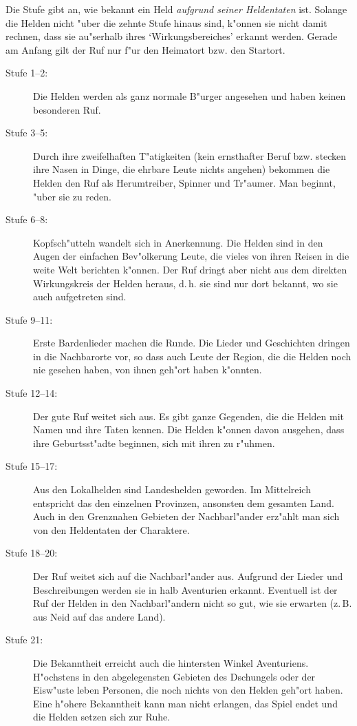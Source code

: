 Die Stufe gibt an, wie bekannt ein Held \emph{aufgrund seiner Heldentaten} ist. Solange die Helden nicht "uber die zehnte Stufe hinaus sind, k"onnen sie nicht damit rechnen, dass sie au"serhalb ihres `Wirkungsbereiches' erkannt werden. Gerade am Anfang gilt der Ruf nur f"ur den Heimatort bzw. den Startort.
\begin{description}
\item[Stufe 1--2:] Die Helden werden als ganz normale B"urger angesehen und haben keinen besonderen Ruf.
\item[Stufe 3--5:] Durch ihre zweifelhaften T"atigkeiten (kein ernsthafter Beruf bzw. stecken ihre Nasen in Dinge, die ehrbare Leute nichts angehen) bekommen die Helden den Ruf als Herumtreiber, Spinner und Tr"aumer. Man beginnt, "uber sie zu reden.
\item[Stufe 6--8:] Kopfsch"utteln wandelt sich in Anerkennung. Die Helden sind in den Augen der einfachen Bev"olkerung Leute, die vieles von ihren Reisen in die weite Welt berichten k"onnen. Der Ruf dringt aber nicht aus dem direkten Wirkungskreis der Helden heraus, d.\,h. sie sind nur dort bekannt, wo sie auch aufgetreten sind.
\item[Stufe 9--11:] Erste Bardenlieder machen die Runde. Die Lieder und Geschichten dringen in die Nachbarorte vor, so dass auch Leute der Region, die die Helden noch nie gesehen haben, von ihnen geh"ort haben k"onnten.
\item[Stufe 12--14:] Der gute Ruf weitet sich aus. Es gibt ganze Gegenden, die die Helden mit Namen und ihre Taten kennen. Die Helden k"onnen davon ausgehen, dass ihre Geburtsst"adte beginnen, sich mit ihren zu r"uhmen.
\item[Stufe 15--17:] Aus den Lokalhelden sind Landeshelden geworden. Im Mittelreich entspricht das den einzelnen Provinzen, ansonsten dem gesamten Land. Auch in den Grenznahen Gebieten der Nachbarl"ander erz"ahlt man sich von den Heldentaten der Charaktere.
\item[Stufe 18--20:] Der Ruf weitet sich auf die Nachbarl"ander aus. Aufgrund der Lieder und Beschreibungen werden sie in halb Aventurien erkannt. Eventuell ist der Ruf der Helden in den Nachbarl"andern nicht so gut, wie sie erwarten (z.\,B. aus Neid auf das andere Land).
\item[Stufe 21:] Die Bekanntheit erreicht auch die hintersten Winkel Aventuriens. H"ochstens in den abgelegensten Gebieten des Dschungels oder der Eisw"uste leben Personen, die noch nichts von den Helden geh"ort haben. Eine h"ohere Bekanntheit kann man nicht erlangen, das Spiel endet und die Helden setzen sich zur Ruhe.
\end{description}

